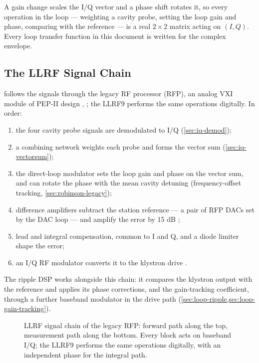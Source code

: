 A gain change scales the I/Q vector and a phase shift rotates it, so every operation in the loop --- weighting a cavity probe, setting the loop gain and phase, comparing with the reference --- is a real \(2\times2\) matrix acting on \((I, Q)\). Every loop transfer function in this document is written for the complex envelope.

\subsection{The LLRF Signal Chain}\label{sec:iq-chain}

 follows the signals through the legacy RF processor (RFP), an analog VXI module of PEP-II design , ; the LLRF9 performs the same operations digitally. In order:

\begin{enumerate}
\item the four cavity probe signals are demodulated to I/Q (\cref{sec:iq-demod});
\item a combining network weights each probe and forms the vector sum (\cref{sec:iq-vectorsum});
\item the direct-loop modulator sets the loop gain and phase on the vector sum, and can rotate the phase with the mean cavity detuning (frequency-offset tracking, \cref{sec:robinson-legacy});
\item difference amplifiers subtract the station reference --- a pair of RFP DACs set by the DAC loop  --- and amplify the error by 15 dB ;
\item lead and integral compensation, common to I and Q, and a diode limiter shape the error;
\item an I/Q RF modulator converts it to the klystron drive .
\end{enumerate}

The ripple DSP works alongside this chain: it compares the klystron output with the reference and applies its phase corrections, and the gain-tracking coefficient, through a further baseband modulator in the drive path (\cref{sec:loop-ripple,sec:loop-gain-tracking}).

\begin{figure}[tbp]
\centering
\begin{fitpicture}\end{fitpicture}
\caption[Legacy LLRF signal chain]{LLRF signal chain of the legacy RFP: forward path along the top, measurement path along the bottom. Every block acts on baseband I/Q; the LLRF9 performs the same operations digitally, with an independent phase for the integral path.}\label{fig:llrf-chain}
\end{figure}

